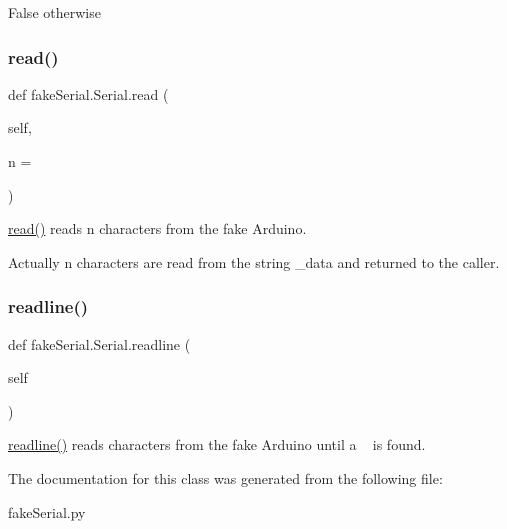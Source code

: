 False otherwise \mbox{\label{classfake_serial_1_1_serial_a46f1021e19572ff944e886e53a51a1d1}} 
\subsubsection{\texorpdfstring{read()}{read()}}
{\footnotesize\ttfamily def fake\+Serial.\+Serial.\+read (\begin{DoxyParamCaption}\item[{}]{self,  }\item[{}]{n = {} }\end{DoxyParamCaption})}



\mbox{\hyperlink{classfake_serial_1_1_serial_a46f1021e19572ff944e886e53a51a1d1}{read()}} reads n characters from the fake Arduino. 

Actually n characters are read from the string \+\_\+data and returned to the caller. \mbox{\label{classfake_serial_1_1_serial_a58f35303f074c25e972c0b16c6382bf4}} 
\subsubsection{\texorpdfstring{readline()}{readline()}}
{\footnotesize\ttfamily def fake\+Serial.\+Serial.\+readline (\begin{DoxyParamCaption}\item[{}]{self }\end{DoxyParamCaption})}



\mbox{\hyperlink{classfake_serial_1_1_serial_a58f35303f074c25e972c0b16c6382bf4}{readline()}} reads characters from the fake Arduino until a ~\newline
 is found. 



The documentation for this class was generated from the following file\+:\begin{DoxyCompactItemize}
\item 
fake\+Serial.\+py\end{DoxyCompactItemize}

